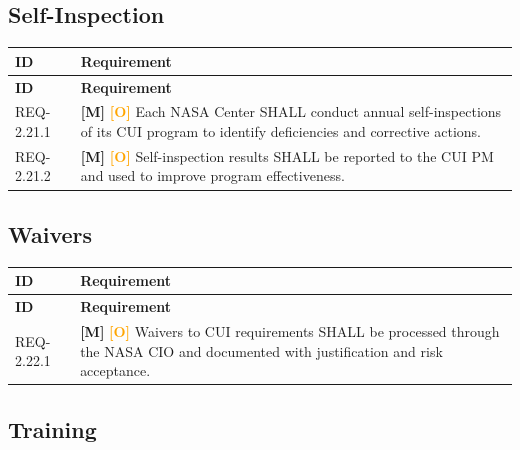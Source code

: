 \documentclass[11pt,letterpaper]{article}
\begin{document}
\subsection{Self-Inspection}

\begin{longtable}{@{}p{1.4cm}p{11.6cm}@{}}
\toprule
\textbf{ID} & \textbf{Requirement} \\
\midrule
\endfirsthead
\toprule
\textbf{ID} & \textbf{Requirement} \\
\midrule
\endhead

REQ-2.21.1 & \textcolor{mandatory}{\textbf{[M]}} \textcolor{orange}{\textbf{[O]}} Each NASA Center SHALL conduct annual self-inspections of its CUI program to identify deficiencies and corrective actions. \\[6pt]

REQ-2.21.2 & \textcolor{mandatory}{\textbf{[M]}} \textcolor{orange}{\textbf{[O]}} Self-inspection results SHALL be reported to the CUI PM and used to improve program effectiveness. \\[6pt]

\bottomrule
\end{longtable}

\subsection{Waivers}

\begin{longtable}{@{}p{1.4cm}p{11.6cm}@{}}
\toprule
\textbf{ID} & \textbf{Requirement} \\
\midrule
\endfirsthead
\toprule
\textbf{ID} & \textbf{Requirement} \\
\midrule
\endhead

REQ-2.22.1 & \textcolor{mandatory}{\textbf{[M]}} \textcolor{orange}{\textbf{[O]}} Waivers to CUI requirements SHALL be processed through the NASA CIO and documented with justification and risk acceptance. \\[6pt]

\bottomrule
\end{longtable}

\subsection{Training}
\end{document}
